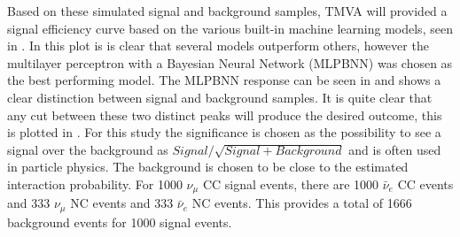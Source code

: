 Based on these simulated signal and background samples, TMVA will provided a signal efficiency curve based on the various built-in machine learning models, seen in . In this plot is is clear that several models outperform others, however the multilayer perceptron with a Bayesian Neural Network (MLPBNN) was chosen as the best performing model. The MLPBNN response can be seen in  and shows a clear distinction between signal and background samples. It is quite clear that any cut between these two distinct peaks will produce the desired outcome, this is plotted in . For this study the significance is chosen as the possibility to see a signal over the background as $Signal/\sqrt{Signal + Background}$ and is often used in particle physics. The background is chosen to be close to the estimated interaction probability. For 1000 $\nu_\mu$ CC signal events, there are 1000 $\bar{\nu}_e$ CC events and 333 $\nu_\mu$ NC events and 333 $\bar{\nu}_e$ NC events. This provides a total of 1666 background events for 1000 signal events.






